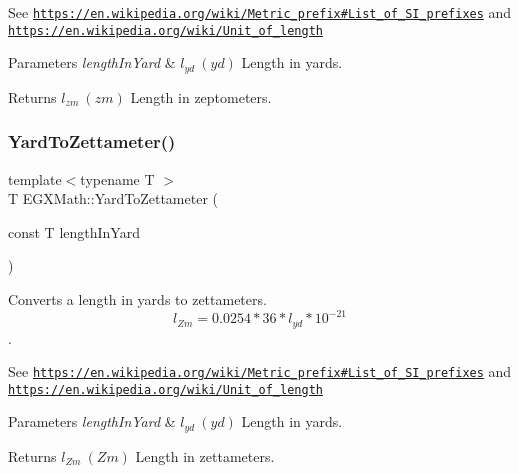 See \href{https://en.wikipedia.org/wiki/Metric_prefix#List_of_SI_prefixes}{\tt https\+://en.\+wikipedia.\+org/wiki/\+Metric\+\_\+prefix\#\+List\+\_\+of\+\_\+\+S\+I\+\_\+prefixes} and \href{https://en.wikipedia.org/wiki/Unit_of_length}{\tt https\+://en.\+wikipedia.\+org/wiki/\+Unit\+\_\+of\+\_\+length} 
\begin{DoxyParams}{Parameters}
{\em length\+In\+Yard} & $ l_{yd}\ (yd)$ Length in yards. \\
\hline
\end{DoxyParams}
\begin{DoxyReturn}{Returns}
$ l_{zm}\ (zm)$ Length in zeptometers. 
\end{DoxyReturn}
\mbox{\label{group___e_g_x_math-_conversions-_length_conversions-_imperial-_yard-_s_i_gace544729d64e05b9b27c098c659f10d1}} 
\subsubsection{\texorpdfstring{Yard\+To\+Zettameter()}{YardToZettameter()}}
{\footnotesize\ttfamily template$<$typename T $>$ \\
T E\+G\+X\+Math\+::\+Yard\+To\+Zettameter (\begin{DoxyParamCaption}\item[{const T}]{length\+In\+Yard }\end{DoxyParamCaption})}



Converts a length in yards to zettameters. \[ l_{Zm}=0.0254 * 36 * l_{yd} * 10^{-21} \]. 

See \href{https://en.wikipedia.org/wiki/Metric_prefix#List_of_SI_prefixes}{\tt https\+://en.\+wikipedia.\+org/wiki/\+Metric\+\_\+prefix\#\+List\+\_\+of\+\_\+\+S\+I\+\_\+prefixes} and \href{https://en.wikipedia.org/wiki/Unit_of_length}{\tt https\+://en.\+wikipedia.\+org/wiki/\+Unit\+\_\+of\+\_\+length} 
\begin{DoxyParams}{Parameters}
{\em length\+In\+Yard} & $ l_{yd}\ (yd)$ Length in yards. \\
\hline
\end{DoxyParams}
\begin{DoxyReturn}{Returns}
$ l_{Zm}\ (Zm)$ Length in zettameters. 
\end{DoxyReturn}
